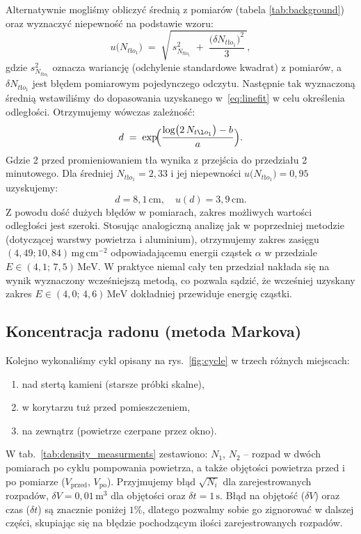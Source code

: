\documentclass[12pt]{article}
\begin{document}
Alternatywnie mogliśmy obliczyć średnią z pomiarów (tabela \ref{tab:background}) oraz wyznaczyć niepewność na podstawie wzoru:
\[
	u\bigl(N_{tło_1}\bigr) \;=\; \sqrt{\,s^2_{N_{tło_1}} \;+\; \frac{\bigl(\delta N_{tło_1}\bigr)^2}{3}\,},
\]
gdzie \(s_{N_{tło_1}}^2\) oznacza wariancję (odchylenie standardowe kwadrat) z pomiarów, a \(\delta N_{tło_1}\) jest błędem pomiarowym pojedynczego odczytu. Następnie tak wyznaczoną średnią wstawiliśmy do dopasowania uzyskanego w~\eqref{eq:linefit} w celu określenia odległości. Otrzymujemy wówczas zależność:
\[
	d \;=\; \exp\!\Bigl(\frac{\log\bigl(2\,N_{tło_1} \bigr) - b}{a}\Bigr).
\]
Gdzie 2 przed promieniowaniem tła wynika z przejścia do przedziału 2 minutowego. Dla średniej \(N_{tło_1} = 2{,}33\) i jej niepewności \(u\bigl(N_{tło_1}\bigr) = 0{,}95\) uzyskujemy:
\[
	d = 8{,}1 \, \mathrm{cm},
	\quad
	u(d) = 3{,}9 \, \mathrm{cm}.
\]
Z powodu dość dużych błędów w pomiarach, zakres możliwych wartości odległości jest szeroki. Stosując analogiczną analizę jak w poprzedniej metodzie (dotyczącej warstwy powietrza i aluminium), otrzymujemy zakres zasięgu \((4{,}49; 10{,}84) \, \mathrm{mg \, cm^{-2}}\) odpowiadającemu energii cząstek \(\alpha\) w przedziale \(E \in (4{,}1;\,7{,}5)\,\mathrm{MeV}\). W praktyce niemal cały ten przedział nakłada się na wynik wyznaczony wcześniejszą metodą, co pozwala sądzić, że wcześniej uzyskany zakres \(E \in (4{,}0;\,4{,}6)\,\mathrm{MeV}\) dokładniej przewiduje energię cząstki.

\subsection{Koncentracja radonu (metoda Markova)}
Kolejno wykonaliśmy cykl opisany na rys.~\ref{fig:cycle} w trzech różnych miejscach:
\begin{enumerate}[noitemsep]
	\item nad stertą kamieni (starsze próbki skalne),
	\item w korytarzu tuż przed pomieszczeniem,
	\item na zewnątrz (powietrze czerpane przez okno).
\end{enumerate}

W tab.~\ref{tab:density_measurments} zestawiono: $N_1$, $N_2$ – rozpad w dwóch pomiarach po cyklu pompowania powietrza, a także objętości powietrza przed i po pomiarze (\(V_{\text{przed}}\), \(V_{\text{po}}\)). Przyjmujemy błąd \(\sqrt{N_i}\) dla zarejestrowanych rozpadów, \(\delta V=0{,}01\,\mathrm{m^3}\) dla objętości oraz \(\delta t = 1 \, \mathrm{s}\).
Błąd na objętość (\(\delta V\)) oraz czas (\(\delta t\)) są znacznie poniżej \(1\%\), dlatego pozwalmy sobie go zignorować w dalszej części, skupiając się na błędzie pochodzącym ilości zarejestrowanych rozpadów.
\end{document}
